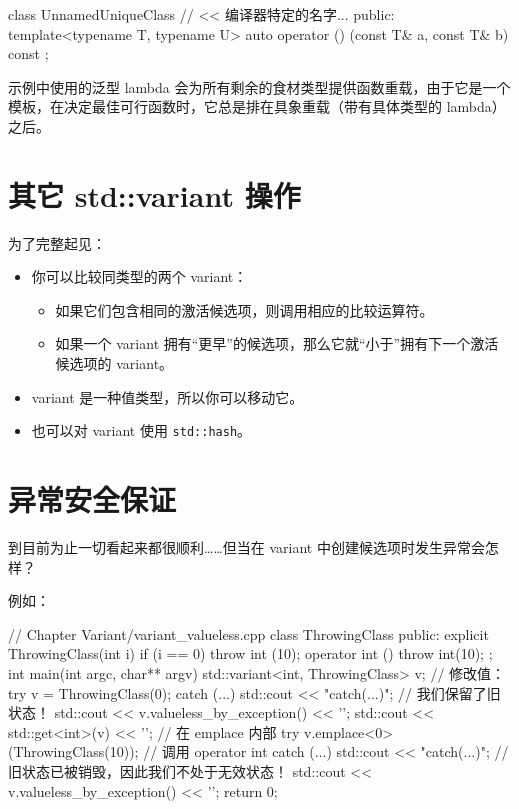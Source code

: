 \begin{codebox}[cpp]
class UnnamedUniqueClass // << 编译器特定的名字...
{
public:
template<typename T, typename U>
auto operator () (const T& a, const T& b) const {
}
};
\end{codebox}

示例中使用的泛型 lambda 会为所有剩余的食材类型提供函数重载，由于它是一个模板，在决定最佳可行函数时，它总是排在具象重载（带有具体类型的 lambda）之后。

\section{其它 std::variant 操作}

为了完整起见：

\begin{itemize}
\item 你可以比较同类型的两个 variant：
  \begin{itemize}
  \item 如果它们包含相同的激活候选项，则调用相应的比较运算符。
  \item 如果一个 variant 拥有“更早”的候选项，那么它就“小于”拥有下一个激活候选项的 variant。
  \end{itemize}
\item variant 是一种值类型，所以你可以移动它。
\item 也可以对 variant 使用 \texttt{std::hash}。
\end{itemize}

\section{异常安全保证}

到目前为止一切看起来都很顺利……但当在 variant 中创建候选项时发生异常会怎样？

例如：

\begin{codebox}[cpp]
// Chapter Variant/variant_valueless.cpp
class ThrowingClass
{
public:
explicit ThrowingClass(int i) { if (i == 0) throw int (10); }
operator int () { throw int(10); }
};
int main(int argc, char** argv)
{
std::variant<int, ThrowingClass> v;
// 修改值：
try
{
v = ThrowingClass(0);
}
catch (...)
{
std::cout << "catch(...)\n";
// 我们保留了旧状态！
std::cout << v.valueless_by_exception() << '\n';
std::cout << std::get<int>(v) << '\n';
}
// 在 emplace 内部
try
{
v.emplace<0>(ThrowingClass(10)); // 调用 operator int
}
catch (...)
{
std::cout << "catch(...)\n";
// 旧状态已被销毁，因此我们不处于无效状态！
std::cout << v.valueless_by_exception() << '\n';
}
return 0;
}
\end{codebox}


